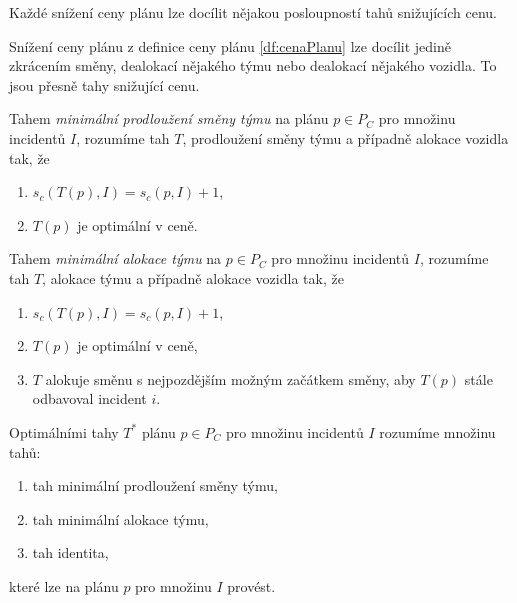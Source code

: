 \begin{veta}\label{veta:kazdeSnizeniCenyJeInv}
  Každé snížení ceny plánu lze docílit nějakou posloupností tahů snižujících cenu.
\end{veta}
\begin{dukaz}
  Snížení ceny plánu z definice ceny plánu \ref{df:cenaPlanu} lze docílit jedině zkrácením směny,
  dealokací nějakého týmu nebo dealokací nějakého vozidla.
  To jsou přesně tahy snižující cenu.
\end{dukaz}


\begin{definice}
  Tahem \textit{minimální prodloužení směny týmu} na plánu $p \in P_C$ pro množinu incidentů $I$, rozumíme tah $T$, prodloužení směny týmu a případně alokace vozidla tak, že
  \begin{enumerate}
    \item
      $s_c(T(p), I) = s_c(p, I) + 1$,
    \item
      $T(p)$ je optimální v ceně.
  \end{enumerate}
\end{definice}

\begin{definice}
  Tahem \textit{minimální alokace týmu} na $p \in P_C$ pro množinu incidentů $I$, rozumíme tah $T$, alokace týmu a případně alokace vozidla tak, že
  \begin{enumerate}
    \item
      $s_c(T(p), I) = s_c(p, I) + 1$,

    \item
      $T(p)$ je optimální v ceně,


    \item
      $T$ alokuje směnu s nejpozdějším možným začátkem směny, aby $T(p)$ stále odbavoval incident $i$. 
  \end{enumerate}
\end{definice}

\begin{definice}\label{df:optimalniTahy}
  Optimálními tahy $T^*$ plánu $p \in P_C$ pro množinu incidentů $I$ rozumíme množinu tahů:
  \begin{enumerate}
  \item
    tah minimální prodloužení směny týmu,
  \item
    tah minimální alokace týmu,
  \item
    tah identita,
  \end{enumerate}
  které lze na plánu $p$ pro množinu $I$ provést.
\end{definice}


